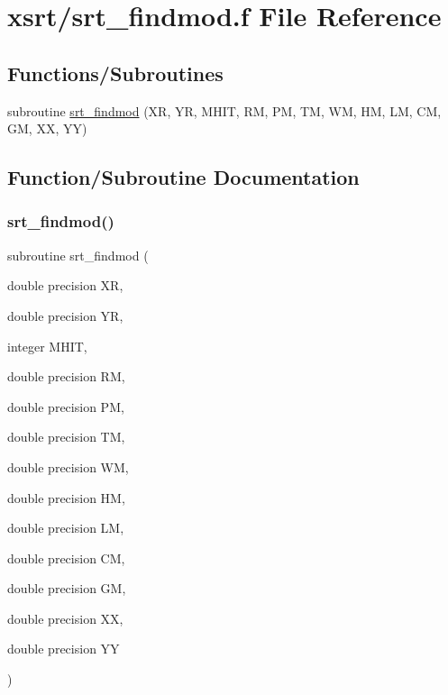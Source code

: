 \hypertarget{srt__findmod_8f}{}\section{xsrt/srt\+\_\+findmod.f File Reference}
\label{srt__findmod_8f}
\subsection*{Functions/\+Subroutines}
\begin{DoxyCompactItemize}
\item 
subroutine \hyperlink{srt__findmod_8f_a67348ab089e5e6142ddb913d5eb7c82b}{srt\+\_\+findmod} (XR, YR, M\+H\+IT, RM, PM, TM, WM, HM, LM, CM, GM, XX, YY)
\end{DoxyCompactItemize}


\subsection{Function/\+Subroutine Documentation}
\mbox{\label{srt__findmod_8f_a67348ab089e5e6142ddb913d5eb7c82b}} 
\subsubsection{\texorpdfstring{srt\+\_\+findmod()}{srt\_findmod()}}
{\footnotesize\ttfamily subroutine srt\+\_\+findmod (\begin{DoxyParamCaption}\item[{double precision}]{XR,  }\item[{double precision}]{YR,  }\item[{integer}]{M\+H\+IT,  }\item[{double precision}]{RM,  }\item[{double precision}]{PM,  }\item[{double precision}]{TM,  }\item[{double precision}]{WM,  }\item[{double precision}]{HM,  }\item[{double precision}]{LM,  }\item[{double precision}]{CM,  }\item[{double precision}]{GM,  }\item[{double precision}]{XX,  }\item[{double precision}]{YY }\end{DoxyParamCaption})}

